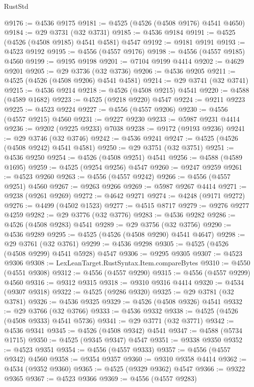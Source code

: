 \begin{lexlean}{RustStd}
\begin{coremodule}
@9176 := @4536 @9175
@9181 := @4525 (@4526 (@4508 @9176) @4541 @4650)
@9184 := @29 @3731 (@32 @3731)
@9185 := @4536 @9184
@9191 := @4525 (@4526 (@4508 @9185) @4541 @4581) @4547
@9192 := @9181 @9191
@9193 := @4523 @9192
@9195 := @4556 (@4557 @9176)
@9198 := @4556 (@4557 @9185) @4560
@9199 := @9195 @9198
@9201 := @7104 @9199 @4414
@9202 := @4629 @9201
@9205 := @29 @3736 (@32 @3736)
@9206 := @4536 @9205
@9211 := @4525 (@4526 (@4508 @9206) @4541 @4581)
@9214 := @29 @3741 (@32 @3741)
@9215 := @4536 @9214
@9218 := @4526 (@4508 @9215) @4541
@9220 := @4588 (@4589 @1682)
@9223 := @4525 (@9218 @9220) @4547
@9224 := @9211 @9223
@9225 := @4523 @9224
@9227 := @4556 (@4557 @9206)
@9230 := @4556 (@4557 @9215) @4560
@9231 := @9227 @9230
@9233 := @5987 @9231 @4414
@9236 := @9202 (@9225 @9233) @7038
@9238 := @9172 (@9193 @9236)
@9241 := @29 @3746 (@32 @3746)
@9242 := @4536 @9241
@9247 := @4525 (@4526 (@4508 @9242) @4541 @4581)
@9250 := @29 @3751 (@32 @3751)
@9251 := @4536 @9250
@9254 := @4526 (@4508 @9251) @4541
@9256 := @4588 (@4589 @1695)
@9259 := @4525 (@9254 @9256) @4547
@9260 := @9247 @9259
@9261 := @4523 @9260
@9263 := @4556 (@4557 @9242)
@9266 := @4556 (@4557 @9251) @4560
@9267 := @9263 @9266
@9269 := @5987 @9267 @4414
@9271 := @9238 (@9261 @9269)
@9272 := @4642 @9271
@9274 := @4248 (@9171 @9272)
@9276 := @4499 (@4502 @1523)
@9277 := @4515 @8717
@9279 := @9276 @9277 @4259
@9282 := @29 @3776 (@32 @3776)
@9283 := @4536 @9282
@9286 := @4526 (@4508 @9283) @4541
@9289 := @29 @3756 (@32 @3756)
@9290 := @4536 @9289
@9295 := @4525 (@4526 (@4508 @9290) @4541 @4647)
@9298 := @29 @3761 (@32 @3761)
@9299 := @4536 @9298
@9305 := @4525 (@4526 (@4508 @9299) @4541 @5928) @4547
@9306 := @9295 @9305
@9307 := @4523 @9306
@9308 := LexLeanTarget.RustSyntax.Item.compareBytes
@9310 := @4550 (@4551 @9308)
@9312 := @4556 (@4557 @9290)
@9315 := @4556 (@4557 @9299) @4560
@9316 := @9312 @9315
@9318 := @9310 @9316 @4414
@9320 := @4534 (@9307 @9318)
@9322 := @4525 (@9286 @9320)
@9325 := @29 @3781 (@32 @3781)
@9326 := @4536 @9325
@9329 := @4526 (@4508 @9326) @4541
@9332 := @29 @3766 (@32 @3766)
@9333 := @4536 @9332
@9338 := @4525 (@4526 (@4508 @9333) @4541 @5736)
@9341 := @29 @3771 (@32 @3771)
@9342 := @4536 @9341
@9345 := @4526 (@4508 @9342) @4541
@9347 := @4588 (@5734 @1715)
@9350 := @4525 (@9345 @9347) @4547
@9351 := @9338 @9350
@9352 := @4523 @9351
@9354 := @4556 (@4557 @9333)
@9357 := @4556 (@4557 @9342) @4560
@9358 := @9354 @9357
@9360 := @9310 @9358 @4414
@9362 := @4534 (@9352 @9360)
@9365 := @4525 (@9329 @9362) @4547
@9366 := @9322 @9365
@9367 := @4523 @9366
@9369 := @4556 (@4557 @9283)

\end{coremodule}
\end{lexlean}
